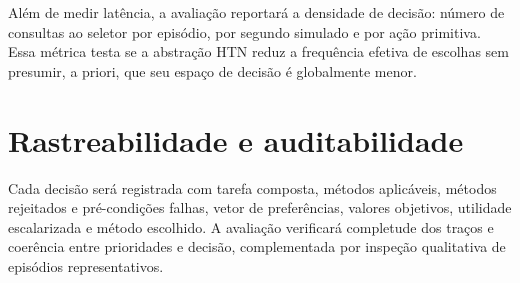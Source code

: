 Além de medir latência, a avaliação reportará a densidade de decisão: número de
consultas ao seletor por episódio, por segundo simulado e por ação primitiva.
Essa métrica testa se a abstração HTN reduz a frequência efetiva de escolhas sem
presumir, a priori, que seu espaço de decisão é globalmente menor.

\section{Rastreabilidade e auditabilidade}
\mbox{}\par\vspace{-0.4em}

Cada decisão será registrada com tarefa composta, métodos aplicáveis, métodos
rejeitados e pré-condições falhas, vetor de preferências, valores objetivos,
utilidade escalarizada e método escolhido.
A avaliação verificará completude dos traços e coerência entre prioridades e
decisão, complementada por inspeção qualitativa de episódios representativos.
